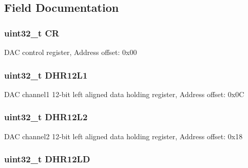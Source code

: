 \subsection{Field Documentation}
\hypertarget{struct_d_a_c___type_def_ab40c89c59391aaa9d9a8ec011dd0907a}{
\subsubsection[{C\-R}]{ uint32\-\_\-t C\-R}}\label{struct_d_a_c___type_def_ab40c89c59391aaa9d9a8ec011dd0907a}
D\-A\-C control register, Address offset\-: 0x00 \hypertarget{struct_d_a_c___type_def_ae9028b8bcb5118b7073165fb50fcd559}{
\subsubsection[{D\-H\-R12\-L1}]{ uint32\-\_\-t D\-H\-R12\-L1}}\label{struct_d_a_c___type_def_ae9028b8bcb5118b7073165fb50fcd559}
D\-A\-C channel1 12-\/bit left aligned data holding register, Address offset\-: 0x0\-C \hypertarget{struct_d_a_c___type_def_a2e45f9c9d67e384187b25334ba0a3e3d}{
\subsubsection[{D\-H\-R12\-L2}]{ uint32\-\_\-t D\-H\-R12\-L2}}\label{struct_d_a_c___type_def_a2e45f9c9d67e384187b25334ba0a3e3d}
D\-A\-C channel2 12-\/bit left aligned data holding register, Address offset\-: 0x18 \hypertarget{struct_d_a_c___type_def_acc269320aff0a6482730224a4b641a59}{
\subsubsection[{D\-H\-R12\-L\-D}]{ uint32\-\_\-t D\-H\-R12\-L\-D}}\label{struct_d_a_c___type_def_acc269320aff0a6482730224a4b641a59}
